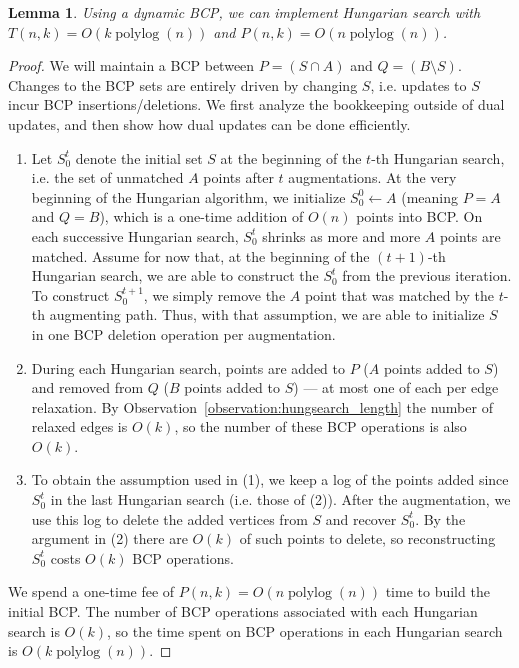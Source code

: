\documentclass[11pt]{article}
\def\polylog{\mathop{\mathrm{polylog}}}
\theoremstyle{plain}
\newtheorem{lemma}{Lemma}
\begin{document}
\begin{lemma}
	Using a dynamic BCP, we can implement Hungarian search with 
	$T(n, k) = O(k\polylog(n))$ and $P(n, k) = O(n\polylog(n))$.
\end{lemma}
\begin{proof}
	We will maintain a BCP between $P = (S \cap A)$ and 
	$Q = (B \setminus S)$.
	Changes to the BCP sets are entirely driven by changing $S$,
	i.e. updates to $S$ incur BCP insertions/deletions.
	We first analyze the bookkeeping outside of dual updates, and then
	show how dual updates can be done efficiently.

	\begin{enumerate}
	\item Let $S^t_0$ denote the initial set $S$ at the beginning of the 
		$t$-th Hungarian search, i.e. the set of unmatched $A$ points
		after $t$ augmentations.
		At the very beginning of the Hungarian algorithm, we initialize 
		$S^0_0 \gets A$ (meaning $P = A$ and $Q = B$), which is a 
		one-time addition of $O(n)$ points into BCP.
		On each successive Hungarian search, $S^t_0$ shrinks as more 
		and more $A$ points are matched.
		Assume for now that, at the beginning of the $(t+1)$-th 
		Hungarian search, we are able to construct the $S^t_0$ from the 
		previous iteration.
		To construct $S^{t+1}_0$, we simply remove the $A$ point that 
		was matched by the $t$-th augmenting path.
		Thus, with that assumption, we are able to initialize $S$ in 
		one BCP deletion operation per augmentation.

	\item During each Hungarian search, points are added to $P$ ($A$ points 
		added to $S$) and removed from $Q$ ($B$ points added to $S$)
		--- at most one of each per edge relaxation.
		By Observation~\ref{observation:hungsearch_length} the number 
		of relaxed edges is $O(k)$, so the number of these BCP 
		operations is also $O(k)$.

	\item To obtain the assumption used in (1), we keep a log of the 
		points added since $S^t_0$ in the last Hungarian search 
		(i.e. those of (2)).
		After the augmentation, we use this log to delete the added 
		vertices from $S$ and recover $S^t_0$.
		By the argument in (2) there are $O(k)$ of such points to 
		delete, so reconstructing $S^t_0$ costs $O(k)$ BCP operations.
	\end{enumerate}
	We spend a one-time fee of $P(n, k) = O(n \polylog(n))$ time to build 
	the initial BCP.
	The number of BCP operations associated with each Hungarian search is 
	$O(k)$, so the time spent on BCP operations in each Hungarian search
	is $O(k \polylog(n))$.
	

\end{proof}
\end{document}
